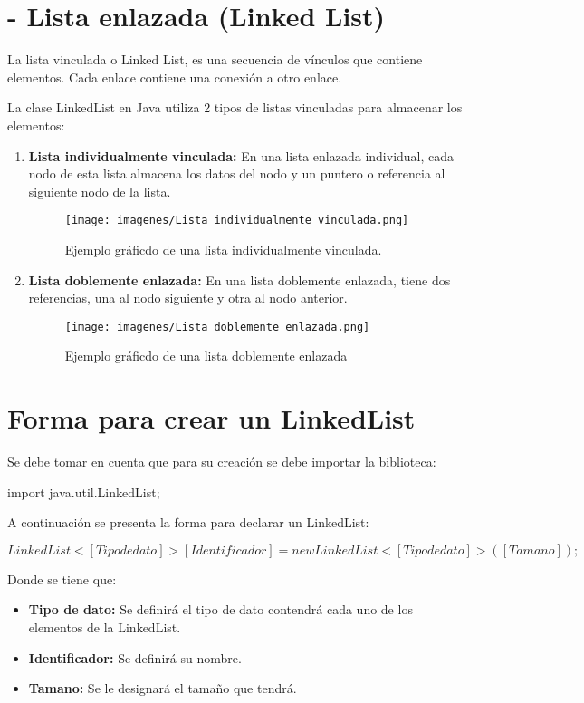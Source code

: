 \documentclass[12pt, letterpaper]{article} %
\begin{document}
\section*{- Lista enlazada (Linked List)}
La lista vinculada o Linked List, es una secuencia de vínculos que contiene elementos. Cada enlace contiene una conexión a otro enlace.

La clase LinkedList en Java utiliza 2 tipos de listas vinculadas para almacenar los elementos:
\begin{enumerate}
    \item \textbf{Lista individualmente vinculada:} En una lista enlazada individual, cada nodo de esta lista almacena los datos del nodo y un puntero o referencia al siguiente nodo de la lista.
    \begin{figure}[h]
        \centering
        \texttt{[image: imagenes/Lista individualmente vinculada.png]}
        \caption{Ejemplo gráficdo de una lista individualmente vinculada.}
        \label{fig:individual}
    \end{figure}

    \item \textbf{Lista doblemente enlazada:} En una lista doblemente enlazada, tiene dos referencias, una al nodo siguiente y otra al nodo anterior.
    \begin{figure}[h]
        \centering
        \texttt{[image: imagenes/Lista doblemente enlazada.png]}
        \caption{Ejemplo gráficdo de una lista doblemente enlazada}
        \label{fig:doblemente}
    \end{figure}

\end{enumerate}

\section*{Forma para crear un LinkedList}
Se debe tomar en cuenta que para su creación se debe importar la biblioteca:

\begin{center}
    import java.util.LinkedList;
\end{center}
A continuación se presenta la forma para declarar un LinkedList:

\begin{center}
    $LinkedList<[Tipo de dato]> [Identificador] = new LinkedList<[Tipo de dato]>([Tamano]);$
\end{center}
Donde se tiene que:
\begin{itemize}
    \item \textbf{Tipo de dato:} Se definirá el tipo de dato contendrá cada uno de los elementos de la LinkedList.
    \item \textbf{Identificador:} Se definirá su nombre.
    \item \textbf{Tamano:} Se le designará el tamaño que tendrá.
\end{itemize}
\end{document}
